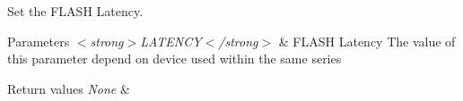 Set the F\+L\+A\+SH Latency. 


\begin{DoxyParams}{Parameters}
{\em $<$strong$>$\+L\+A\+T\+E\+N\+C\+Y$<$/strong$>$} & F\+L\+A\+SH Latency The value of this parameter depend on device used within the same series \\
\hline
\end{DoxyParams}

\begin{DoxyRetVals}{Return values}
{\em None} & \\
\hline
\end{DoxyRetVals}
